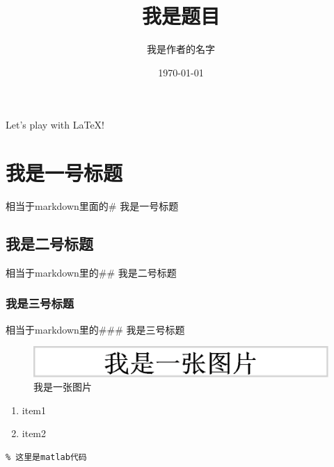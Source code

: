 \documentclass[UTF8]{ctexart}
\title{我是题目}
\author{我是作者的名字}
\date{\today}%
\begin{document}
\maketitle

Let's play with \LaTeX!
\section{我是一号标题}
相当于markdown里面的\# 我是一号标题
\subsection{我是二号标题}
相当于markdown里的\#\# 我是二号标题
\subsubsection{我是三号标题}
相当于markdown里的\#\#\# 我是三号标题

\begin{figure}[H]%
\centering%
\includegraphics[width = .8\textwidth]{我是一张图片.png}%
\caption{我是一张图片}%
\label{fig:1}%
\end{figure}

\begin{enumerate}
\item item1
\item item2
\end{enumerate}

\begin{lstlisting}
% 这里是matlab代码
\end{lstlisting}


\end{document}
